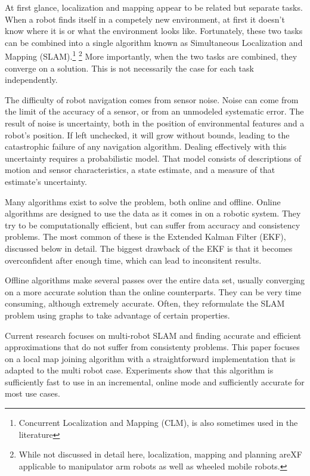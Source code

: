 \documentclass[12pt]{report}
\begin{document}
At first glance, localization and mapping appear to be related but
separate tasks.  When a robot finds itself in a competely new
environment, at first it doesn't know where it is or what the
environment looks like.  Fortunately, these two tasks can be combined
into a single algorithm known as Simultaneous Localization and Mapping
(SLAM).\footnote{Concurrent Localization and Mapping (CLM), is also
  sometimes used in the literature} \footnote{While not discussed in
  detail here, localization, mapping and planning areXF applicable to
  manipulator arm robots as well as wheeled mobile robots.}  More
importantly, when the two tasks are combined, they converge on a
solution.  This is not necessarily the case for each task
independently.

The difficulty of robot navigation comes from sensor noise. Noise can
come from the limit of the accuracy of a sensor, or from an unmodeled
systematic error. The result of noise is uncertainty, both in the
position of environmental features and a robot's position. If left
unchecked, it will grow without bounds, leading to the catastrophic
failure of any navigation algorithm. Dealing effectively with this
uncertainty requires a probabilistic model. That model consists of
descriptions of motion and sensor characteristics, a state estimate,
and a measure of that estimate's uncertainty.

Many algorithms exist to solve the problem, both online and offline.
Online algorithms are designed to use the data as it comes in on a
robotic system. They try to be computationally efficient, but can
suffer from accuracy and consistency problems. The most common of
these is the Extended Kalman Filter (EKF), discussed below in detail.
The biggest drawback of the EKF is that it becomes overconfident
after enough time, which can lead to inconsitent results.

Offline algorithms make several passes over the entire data set,
usually converging on a more accurate solution than the online
counterparts. They can be very time consuming, although extremely
accurate. Often, they reformulate the SLAM problem using graphs to
take advantage of certain properties.

Current research focuses on multi-robot SLAM and finding accurate and
efficient approximations that do not suffer from consistenty
problems. This paper focuses on a local map joining algorithm with a
straightforward implementation that is adapted to the multi robot
case. Experiments show that this algorithm is sufficiently fast to use
in an incremental, online mode and sufficiently accurate for most use
cases.
\end{document}
